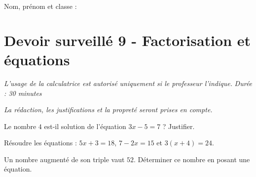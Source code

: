 \documentclass[a4paper,10pt]{report}
\begin{document}
\pagestyle{empty}
\noindent Nom, prénom et classe : \dotfill

\section*{Devoir surveillé 9 - Factorisation et équations}

\noindent \textit{L'usage de la calculatrice est autorisé uniquement si le professeur l'indique.} \hfill \textit{Durée : 30 minutes}

\medskip
\noindent \textit{La rédaction, les justifications et la propreté seront prises en compte.}


\begin{ex}[Tester]
Le nombre $4$ est-il solution de l'équation $3x-5=7$ ? Justifier.
\medskip\noindent\grandscarreaux{\linewidth}{2.5cm}
\end{ex}
\begin{ex}[Résoudre]
Résoudre les équations : $5x+3=18$, $7-2x=15$ et $3(x+4)=24$.
\medskip\noindent\grandscarreaux{\linewidth}{5cm}
\end{ex}
\begin{ex}[Problème]
Un nombre augmenté de son triple vaut $52$. Déterminer ce nombre en posant une équation.
\medskip\noindent\grandscarreaux{\linewidth}{4cm}
\end{ex}
\end{document}
